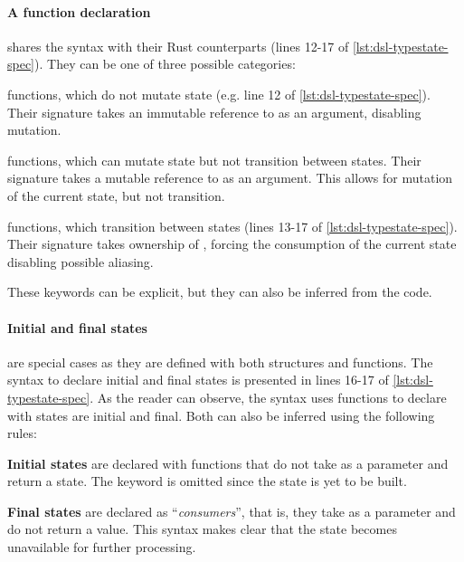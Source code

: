 \paragraph{A function declaration} shares the syntax with their Rust counterparts (lines 12-17 of \autoref{lst:dsl-typestate-spec}).
They can be one of three possible categories:
\begin{compactitem}
    \item {} functions, which do not mutate state (e.g. line 12 of \autoref{lst:dsl-typestate-spec}).
    Their signature takes an immutable reference to  as an argument,
    disabling mutation.
    \item {} functions, which can mutate state but not transition between states.
    Their signature takes a mutable reference to  as an argument.
    This allows for mutation of the current state, but not transition.
    \item {} functions, which transition between states (lines 13-17 of \autoref{lst:dsl-typestate-spec}).
    Their signature takes ownership of ,
    forcing the consumption of the current state disabling possible aliasing.
\end{compactitem}
These keywords can be explicit, but they can also be inferred from the code.

\paragraph{Initial and final states} are special cases as they are defined with both structures and functions.
The syntax to declare initial and final states is presented in lines 16-17 of \autoref{lst:dsl-typestate-spec}.
As the reader can observe, the syntax uses functions to declare with states are initial and final.
Both can also be inferred using the following rules:
\begin{compactitem}
    \item \textbf{Initial states} are declared with functions that do not take  as a parameter and return a state.
    The  keyword is omitted since the state is yet to be built.
    \item \textbf{Final states} are declared as “\emph{consumers}”, that is, they take  as a parameter and do not return a value.
    This syntax makes clear that the state becomes unavailable for further processing.
\end{compactitem}

